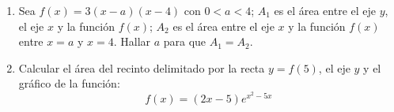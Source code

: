 \documentclass[12pt]{article}
\theoremstyle{definition}
\begin{document}
\begin{enumerate}
\item  
Sea $f(x)=3(x-a)(x-4)$ con $0<a<4$;  $A_1$ es el área entre el eje $y$, el eje $x$ y la función $f(x)$; $A_2$ es el área entre el eje $x$  y la función $f(x)$ entre $x = a$ y $x = 4$. Hallar $a$ para que $A_1=A_2$. 

\item  
Calcular el área del  recinto delimitado por la recta $y = f(5)$,  el eje $y$ y el gráfico de la función:
\begin{equation*}
f(x)=(2x-5)e^{x^2-5x}
\end{equation*}

\end{enumerate}
\end{document}
